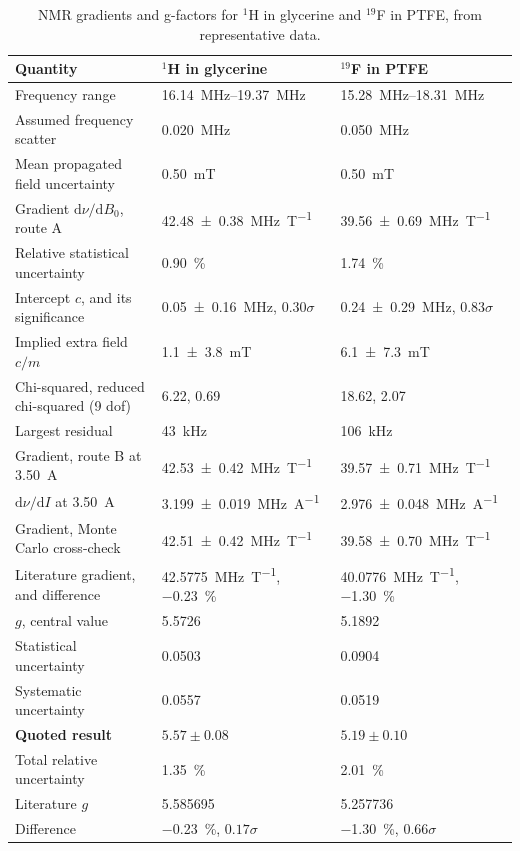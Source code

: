 \documentclass[11pt,a4paper]{article}
\begin{document}
\begin{table}[htbp]
\centering
\caption{NMR gradients and g-factors for $^{1}$H in glycerine and $^{19}$F in PTFE, from
representative data.}
\label{tab:nmrfit}
\footnotesize
\begin{tabular}{@{}L{5.0cm}L{5.3cm}L{5.3cm}@{}}
\toprule
Quantity & $^{1}$H in glycerine & $^{19}$F in PTFE \\
\midrule
Frequency range & \SIrange{16.14}{19.37}{\mega\hertz} & \SIrange{15.28}{18.31}{\mega\hertz} \\
Assumed frequency scatter & \SI{0.020}{\mega\hertz} & \SI{0.050}{\mega\hertz} \\
Mean propagated field uncertainty & \SI{0.50}{\milli\tesla} & \SI{0.50}{\milli\tesla} \\
Gradient $\mathrm{d}\nu/\mathrm{d}B_0$, route A & \SI{42.48 \pm 0.38}{\mega\hertz\per\tesla} & \SI{39.56 \pm 0.69}{\mega\hertz\per\tesla} \\
Relative statistical uncertainty & \SI{0.90}{\percent} & \SI{1.74}{\percent} \\
Intercept $c$, and its significance & \SI{0.05 \pm 0.16}{\mega\hertz}, $0.30\sigma$ & \SI{0.24 \pm 0.29}{\mega\hertz}, $0.83\sigma$ \\
Implied extra field $c/m$ & \SI{+1.1 \pm 3.8}{\milli\tesla} & \SI{+6.1 \pm 7.3}{\milli\tesla} \\
Chi-squared, reduced chi-squared (9 dof) & 6.22, 0.69 & 18.62, 2.07 \\
Largest residual & \SI{43}{\kilo\hertz} & \SI{106}{\kilo\hertz} \\
Gradient, route B at \SI{3.50}{\ampere} & \SI{42.53 \pm 0.42}{\mega\hertz\per\tesla} & \SI{39.57 \pm 0.71}{\mega\hertz\per\tesla} \\
$\mathrm{d}\nu/\mathrm{d}I$ at \SI{3.50}{\ampere} & \SI{3.199 \pm 0.019}{\mega\hertz\per\ampere} & \SI{2.976 \pm 0.048}{\mega\hertz\per\ampere} \\
Gradient, Monte Carlo cross-check & \SI{42.51 \pm 0.42}{\mega\hertz\per\tesla} & \SI{39.58 \pm 0.70}{\mega\hertz\per\tesla} \\
Literature gradient, and difference & \SI{42.5775}{\mega\hertz\per\tesla}, \SI{-0.23}{\percent} & \SI{40.0776}{\mega\hertz\per\tesla}, \SI{-1.30}{\percent} \\
\midrule
$g$, central value & 5.5726 & 5.1892 \\
Statistical uncertainty & 0.0503 & 0.0904 \\
Systematic uncertainty & 0.0557 & 0.0519 \\
\textbf{Quoted result} & $\mathbf{5.57 \pm 0.08}$ & $\mathbf{5.19 \pm 0.10}$ \\
Total relative uncertainty & \SI{1.35}{\percent} & \SI{2.01}{\percent} \\
Literature $g$ & 5.585695 & 5.257736 \\
Difference & \SI{-0.23}{\percent}, $0.17\sigma$ & \SI{-1.30}{\percent}, $0.66\sigma$ \\
\bottomrule
\end{tabular}
\end{table}
\end{document}
